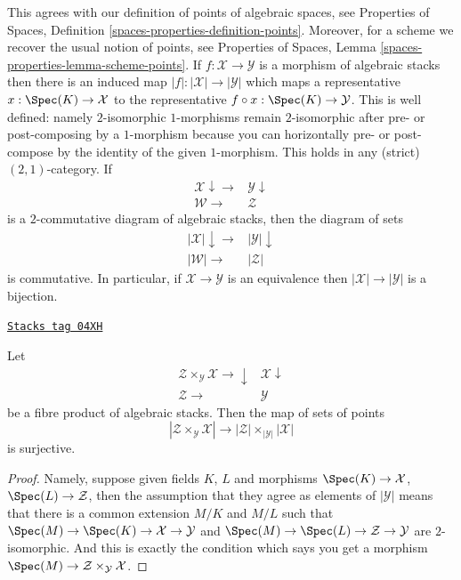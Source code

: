 This agrees with our definition of points of algebraic spaces, see
Properties of Spaces, Definition \ref{spaces-properties-definition-points}.
Moreover, for a scheme we recover the usual notion of points, see
Properties of Spaces, Lemma \ref{spaces-properties-lemma-scheme-points}.
If $f : \mathcal{X} \to \mathcal{Y}$ is a morphism of algebraic stacks
then there is an induced map $|f| : |\mathcal{X}| \to |\mathcal{Y}|$ which
maps a representative $x : \Spec(K) \to \mathcal{X}$ to the
representative $f \circ x : \Spec(K) \to \mathcal{Y}$. This is
well defined: namely $2$-isomorphic $1$-morphisms remain $2$-isomorphic after
pre- or post-composing by a $1$-morphism because you can horizontally
pre- or post-compose by the identity of the given $1$-morphism. This holds
in any (strict) $(2, 1)$-category. If
$$
\begin{array}{cc}\mathcal{X} \downarrow\longrightarrow & \mathcal{Y} \downarrow \\ \mathcal{W} \longrightarrow & \mathcal{Z}\end{array}
$$
is a $2$-commutative diagram of algebraic stacks, then the diagram
of sets
$$
\begin{array}{cc}|\mathcal{X}| \downarrow\longrightarrow & |\mathcal{Y}| \downarrow \\ |\mathcal{W}| \longrightarrow & |\mathcal{Z}|\end{array}
$$
is commutative.
In particular, if $\mathcal{X} \to \mathcal{Y}$ is an equivalence
then $|\mathcal{X}| \to |\mathcal{Y}|$ is a bijection.

\begin{lemma}
\label{stacks-properties-lemma-points-cartesian}
\href{https://stacks.math.columbia.edu/tag/04XH}{\texttt{Stacks tag 04XH}}

Let
$$
\begin{array}{cc}\mathcal{Z} \times_\mathcal{Y} \mathcal{X} \longrightarrow\downarrow & \mathcal{X} \downarrow \\ \mathcal{Z} \longrightarrow & \mathcal{Y}\end{array}
$$
be a fibre product of algebraic stacks. Then the map of sets
of points
$$
|\mathcal{Z} \times_\mathcal{Y} \mathcal{X}|
\longrightarrow
|\mathcal{Z}| \times_{|\mathcal{Y}|} |\mathcal{X}|
$$
is surjective.
\end{lemma}

\begin{proof}
Namely, suppose given fields $K$, $L$ and morphisms
$\Spec(K) \to \mathcal{X}$, $\Spec(L) \to \mathcal{Z}$,
then the assumption that they agree as elements of $|\mathcal{Y}|$ means that
there is a common extension $M/K$ and $M/L$
such that
$\Spec(M) \to \Spec(K) \to \mathcal{X} \to \mathcal{Y}$ and
$\Spec(M) \to \Spec(L) \to \mathcal{Z} \to \mathcal{Y}$
are $2$-isomorphic. And this is exactly the condition which says you get a
morphism $\Spec(M) \to \mathcal{Z} \times_\mathcal{Y} \mathcal{X}$.
\end{proof}

